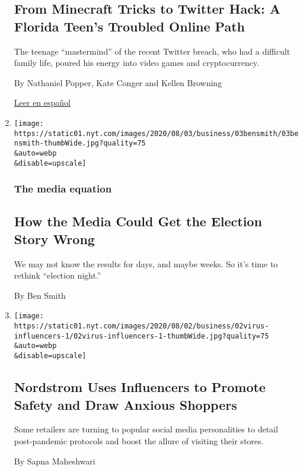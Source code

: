 \begin{enumerate}
{  \subsection{From Minecraft Tricks to Twitter Hack: A Florida Teen's
  Troubled Online
  Path}\label{from-minecraft-tricks-to-twitter-hack-a-florida-teens-troubled-online-path}}

  The teenage ``mastermind'' of the recent Twitter breach, who had a
  difficult family life, poured his energy into video games and
  cryptocurrency.

  By Nathaniel Popper, Kate Conger and Kellen Browning

  \href{https://www.nytimes.com/es/2020/08/04/espanol/negocios/joven-florida-hacker-twitter.html}{Leer
  en español}
\item
  \href{/2020/08/02/business/media/election-coverage.html}{}

  \texttt{[image: https://static01.nyt.com/images/2020/08/03/business/03bensmith/03bensmith-thumbWide.jpg?quality=75\\\&auto=webp\\\&disable=upscale]}

  \hypertarget{the-media-equation}{%
  \subsubsection{The media equation}\label{the-media-equation}}

  \hypertarget{how-the-media-could-get-the-election-story-wrong}{%
  \subsection{How the Media Could Get the Election Story
  Wrong}\label{how-the-media-could-get-the-election-story-wrong}}

  We may not know the results for days, and maybe weeks. So it's time to
  rethink ``election night.''

  By Ben Smith
\item
  \href{/2020/08/02/business/media/coronavirus-nordstrom-infuencers.html}{}

  \texttt{[image: https://static01.nyt.com/images/2020/08/02/business/02virus-influencers-1/02virus-influencers-1-thumbWide.jpg?quality=75\\\&auto=webp\\\&disable=upscale]}

  \hypertarget{nordstrom-uses-influencers-to-promote-safety-and-draw-anxious-shoppers}{%
  \subsection{Nordstrom Uses Influencers to Promote Safety and Draw
  Anxious
  Shoppers}\label{nordstrom-uses-influencers-to-promote-safety-and-draw-anxious-shoppers}}

  Some retailers are turning to popular social media personalities to
  detail post-pandemic protocols and boost the allure of visiting their
  stores.

  By Sapna Maheshwari
\end{enumerate}

